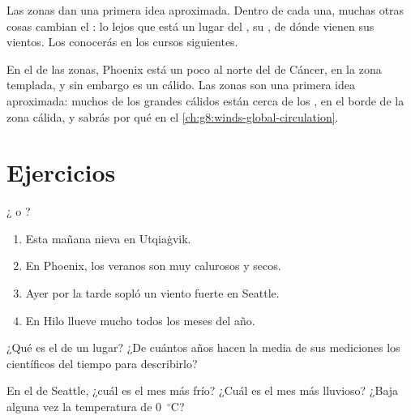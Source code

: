 Las zonas dan una primera idea aproximada. Dentro de cada una, muchas otras
cosas cambian el : lo lejos que está un lugar del , su , de
dónde vienen sus vientos. Los conocerás en los cursos siguientes.

\begin{remark}\label{rem:g5:weather-and-climate:phoenix}
En el  de las zonas, Phoenix está un poco al norte del  de
Cáncer, en la zona templada, y sin embargo es un  cálido. Las zonas
son una primera idea aproximada: muchos de los grandes  cálidos
están cerca de los , en el borde de la zona cálida, y sabrás por qué
en el \cref{ch:g8:winds-global-circulation}.
\end{remark}

\section{Ejercicios}

\begin{exercise}[$\star$]\label{exo:g5:weather-and-climate:1}
¿ o ?
\begin{enumerate}
  \item[(a)] Esta mañana nieva en Utqiaġvik.
  \item[(b)] En Phoenix, los veranos son muy calurosos y secos.
  \item[(c)] Ayer por la tarde sopló un viento fuerte en Seattle.
  \item[(d)] En Hilo llueve mucho todos los meses del año.
\end{enumerate}
\end{exercise}

\begin{exercise}[$\star$]\label{exo:g5:weather-and-climate:2}
¿Qué es el  de un lugar? ¿De cuántos años hacen la media de sus
mediciones los científicos del tiempo para describirlo?
\end{exercise}

\begin{exercise}[$\star$]\label{exo:g5:weather-and-climate:3}
En el  de Seattle, ¿cuál es el mes más frío? ¿Cuál es el mes más
lluvioso? ¿Baja alguna vez la temperatura de 0~$^\circ$C?
\end{exercise}

